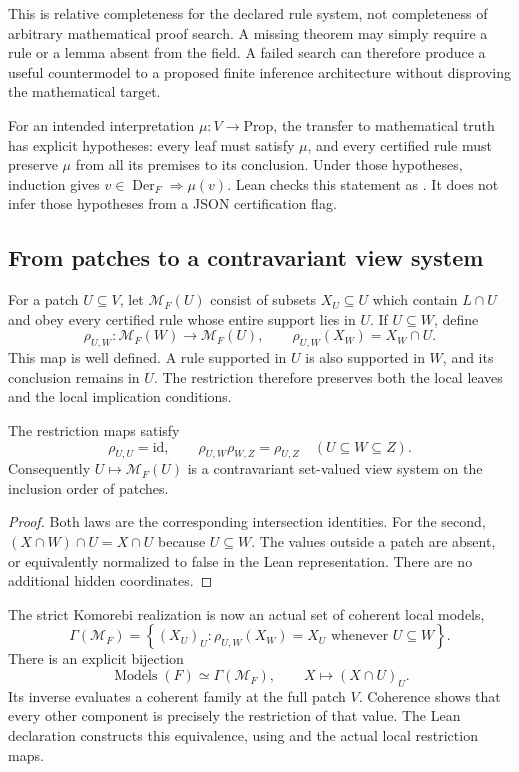 This is relative completeness for the declared rule system, not completeness of arbitrary mathematical proof search. A missing theorem may simply require a rule or a lemma absent from the field. A failed search can therefore produce a useful countermodel to a proposed finite inference architecture without disproving the mathematical target.

For an intended interpretation $\mu:V\to\mathrm{Prop}$, the transfer to mathematical truth has explicit hypotheses: every leaf must satisfy $\mu$, and every certified rule must preserve $\mu$ from all its premises to its conclusion. Under those hypotheses, induction gives $v\in\operatorname{Der}_F\Rightarrow\mu(v)$. Lean checks this statement as . It does not infer those hypotheses from a JSON certification flag.

\subsection{From patches to a contravariant view system}

For a patch $U\subseteq V$, let $\mathcal M_F(U)$ consist of subsets $X_U\subseteq U$ which contain $L\cap U$ and obey every certified rule whose entire support lies in $U$. If $U\subseteq W$, define
\[
\rho_{U,W}:\mathcal M_F(W)\longrightarrow\mathcal M_F(U),
\qquad \rho_{U,W}(X_W)=X_W\cap U.
\]
This map is well defined. A rule supported in $U$ is also supported in $W$, and its conclusion remains in $U$. The restriction therefore preserves both the local leaves and the local implication conditions.

\begin{proposition}
The restriction maps satisfy
\[
\rho_{U,U}=\mathrm{id},\qquad
\rho_{U,W}\rho_{W,Z}=\rho_{U,Z}\quad(U\subseteq W\subseteq Z).
\]
Consequently $U\mapsto\mathcal M_F(U)$ is a contravariant set-valued view system on the inclusion order of patches.
\end{proposition}
\begin{proof}
Both laws are the corresponding intersection identities. For the second, $(X\cap W)\cap U=X\cap U$ because $U\subseteq W$. The values outside a patch are absent, or equivalently normalized to false in the Lean representation. There are no additional hidden coordinates.
\end{proof}

The strict Komorebi realization is now an actual set of coherent local models,
\[
\Gamma(\mathcal M_F)=
\left\{(X_U)_U:\rho_{U,W}(X_W)=X_U\text{ whenever }U\subseteq W\right\}.
\]
There is an explicit bijection
\[
\operatorname{Models}(F)\simeq\Gamma(\mathcal M_F),
\qquad X\longmapsto(X\cap U)_U.
\]
Its inverse evaluates a coherent family at the full patch $V$. Coherence shows that every other component is precisely the restriction of that value. The Lean declaration  constructs this equivalence, using  and the actual local restriction maps.

